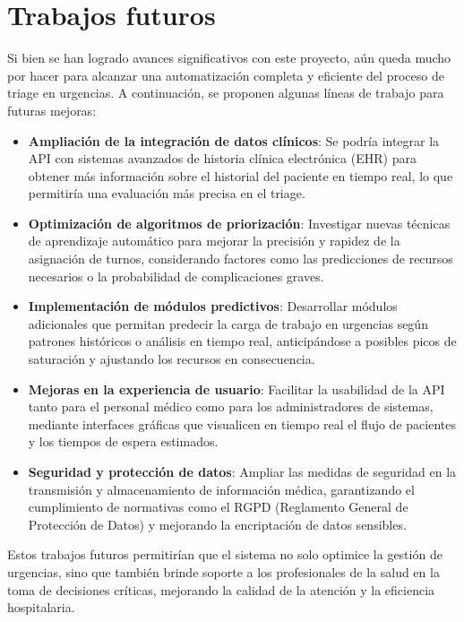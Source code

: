 \section{Trabajos futuros}

Si bien se han logrado avances significativos con este proyecto, aún queda mucho por hacer para alcanzar una automatización completa y eficiente del proceso de triage en urgencias. A continuación, se proponen algunas líneas de trabajo para futuras mejoras:

\begin{itemize}
    \item \textbf{Ampliación de la integración de datos clínicos}: Se podría integrar la API con sistemas avanzados de historia clínica electrónica (EHR) para obtener más información sobre el historial del paciente en tiempo real, lo que permitiría una evaluación más precisa en el triage.
    \item \textbf{Optimización de algoritmos de priorización}: Investigar nuevas técnicas de aprendizaje automático para mejorar la precisión y rapidez de la asignación de turnos, considerando factores como las predicciones de recursos necesarios o la probabilidad de complicaciones graves.
    \item \textbf{Implementación de módulos predictivos}: Desarrollar módulos adicionales que permitan predecir la carga de trabajo en urgencias según patrones históricos o análisis en tiempo real, anticipándose a posibles picos de saturación y ajustando los recursos en consecuencia.
    \item \textbf{Mejoras en la experiencia de usuario}: Facilitar la usabilidad de la API tanto para el personal médico como para los administradores de sistemas, mediante interfaces gráficas que visualicen en tiempo real el flujo de pacientes y los tiempos de espera estimados.
    \item \textbf{Seguridad y protección de datos}: Ampliar las medidas de seguridad en la transmisión y almacenamiento de información médica, garantizando el cumplimiento de normativas como el RGPD (Reglamento General de Protección de Datos) y mejorando la encriptación de datos sensibles.
\end{itemize}

Estos trabajos futuros permitirían que el sistema no solo optimice la gestión de urgencias, sino que también brinde soporte a los profesionales de la salud en la toma de decisiones críticas, mejorando la calidad de la atención y la eficiencia hospitalaria.
